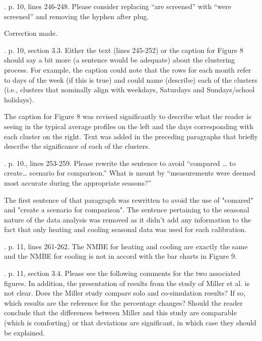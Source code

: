 \documentclass[answers,12pt]{exam}
\begin{document}
\begin{questions}
. p. 10, lines 246-248.  Please consider replacing “are screened” with “were screened” and removing the hyphen after plug. 
\begin{solution}
Correction made.
\end{solution}

. p. 10, section 3.3.  Either the text (lines 245-252) or the caption for Figure 8 should say a bit more (a sentence would be adequate) about the clustering process.  For example, the caption could note that the rows for each month refer to days of the week (if this is true) and could name (describe) each of the clusters (i.e., clusters that nominally align with weekdays, Saturdays and Sundays/school holidays). 
\begin{solution}
The caption for Figure 8 was revised significantly to describe what the reader is seeing in the typical average profiles on the left and the days corresponding with
each cluster on the right. Text was added in the preceding paragraphs that briefly describe the significance of each of the clusters.
\end{solution}

. p. 10., lines 253-259.  Please rewrite the sentence to avoid “compared … to create… scenario for comparison.” What is meant by “measurements were deemed most accurate during the appropriate seasons?”
\begin{solution}
The first sentence of that paragraph was rewritten to avoid the use of "comared" and "create a scenario for comparison". The sentence pertaining to the seasonal nature of the data analysis was removed as it didn't add any information to the fact that only heating and cooling seasonal data was used for each calibration.
\end{solution}

. p. 11, lines 261-262.  The NMBE for heating and cooling are exactly the same and the NMBE for cooling is not in accord with the bar charts in Figure 9. 
\begin{solution}
\end{solution}

. p. 11, section 3.4.  Please see the following comments for the two associated figures.  In addition, the presentation of results from the study of Miller et al. is not clear.  Does the Miller study compare solo and co-simulation results?  If so, which results are the reference for the percentage changes? Should the reader conclude that the differences between Miller and this study are comparable (which is comforting) or that deviations are significant, in which case they should be explained. 
\begin{solution}
\end{solution}


\end{questions}
\end{document}
